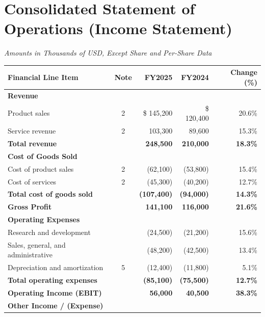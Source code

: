 \section*{Consolidated Statement of Operations (Income Statement)}
\begin{center}
  \small\textit{Amounts in Thousands of USD, Except Share and Per-Share Data}
\end{center}
\vspace{10pt}

\noindent
\begin{tabularx}{\textwidth}{L c R R R}
  \textbf{Financial Line Item} & \textbf{Note} & \textbf{FY2025} & \textbf{FY2024} & \textbf{Change (\%)} \\
  \midrule
  \textbf{Revenue} & & & & \\
  \quad Product sales & 2 & \$ 145,200 & \$ 120,400 & 20.6\% \\
  \quad Service revenue & 2 & 103,300 & 89,600 & 15.3\% \\
  \textbf{Total revenue} & & \textbf{248,500} & \textbf{210,000} & \textbf{18.3\%} \\
  \midrule
  \textbf{Cost of Goods Sold} & & & & \\
  \quad Cost of product sales & 2 & (62,100) & (53,800) & 15.4\% \\
  \quad Cost of services & 2 & (45,300) & (40,200) & 12.7\% \\
  \textbf{Total cost of goods sold} & & \textbf{(107,400)} & \textbf{(94,000)} & \textbf{14.3\%} \\
  \midrule
  \textbf{Gross Profit} & & \textbf{141,100} & \textbf{116,000} & \textbf{21.6\%} \\
  \midrule
  \textbf{Operating Expenses} & & & & \\
  \quad Research and development & & (24,500) & (21,200) & 15.6\% \\
  \quad Sales, general, and administrative & & (48,200) & (42,500) & 13.4\% \\
  \quad Depreciation and amortization & 5 & (12,400) & (11,800) & 5.1\% \\
  \textbf{Total operating expenses} & & \textbf{(85,100)} & \textbf{(75,500)} & \textbf{12.7\%} \\
  \midrule
  \textbf{Operating Income (EBIT)} & & \textbf{56,000} & \textbf{40,500} & \textbf{38.3\%} \\
  \midrule
  \textbf{Other Income / (Expense)} & & & & \\

\end{tabularx}
